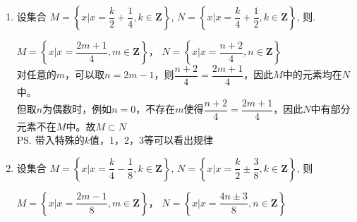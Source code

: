 \begin{enumerate}
\begin{enumerate}
        \begin{jieda}
            首先进行变形有$M = \left\{x | x = \dfrac{6m+1}{6}, m \in \mathbf{Z}\right\}, N = \left\{x | x = \dfrac{3n-2}{6}, n \in \mathbf{Z}\right\}, P = \left\{x | x = \dfrac{3p+1}{6}, p \in \mathbf{Z}\right\}$ \\
            $\forall x \in N, x = \dfrac{3n-2}{6} = \dfrac{3(n-1)+1}{6}$，$n-1 \in \mathbf{Z}$，故$x \in P$，因此$N \subseteq P$。\\
            $\forall x \in P, x = \dfrac{3p+1}{6} = \dfrac{3(p+1)-2}{6}$，$p+1 \in \mathbf{Z}$，故$x \in N$，因此$P \subseteq N$。\\
            因此$N = P$ \\
            $\forall x \in M, x = \dfrac{6m+1}{6} = \dfrac{3(2m)-2}{6}$，$2m \in \mathbf{Z}$，故$x \in P$，因此$M \subseteq P$。\\
            而$p = 1$时$\dfrac{2}{3} \in P$，但是$\dfrac{2}{3} \notin M$，因此$P \neq M$ \\
            因此$M \subset P$
        \end{jieda}
        \item 设集合 $M=\left\{x|x=\dfrac{k}{2} + \dfrac{1}{4}, k \in \mathbf{Z}\right\}$, $N=\left\{x|x=\dfrac{k}{4} + \dfrac{1}{2}, k \in \mathbf{Z}\right\}$, 则. 
        \begin{jieda}
            $M=\left\{x|x=\dfrac{2m+1}{4}, m \in \mathbf{Z}\right\}$， $N=\left\{x|x=\dfrac{n+2}{4}, n \in \mathbf{Z}\right\}$\\
            对任意的$m$，可以取$n = 2m-1$，则$\dfrac{n+2}{4} = \dfrac{2m+1}{4}$，因此$M$中的元素均在$N$中。\\
            但取$n$为偶数时，例如$n = 0$，不存在$m$使得$\dfrac{n+2}{4} = \dfrac{2m+1}{4}$，因此$N$中有部分元素不在$M$中。故$M \subset N$\\
            \ps 带入特殊的$k$值，1，2，3等可以看出规律
        \end{jieda}
        \item 设集合 $M=\left\{x|x=\dfrac{k}{4} - \dfrac{1}{8}, k \in \mathbf{Z}\right\}$, $N=\left\{x|x=\dfrac{k}{2} \pm \dfrac{3}{8}, k \in \mathbf{Z}\right\}$, 则
        \begin{jieda}
            $M=\left\{x|x=\dfrac{2m-1}{8}, m \in \mathbf{Z}\right\}$， $N=\left\{x|x=\dfrac{4n \pm 3}{8}, n \in \mathbf{Z}\right\}$
            \begin{enumerate}

\end{enumerate}
\end{jieda}
\end{enumerate}
\end{enumerate}
